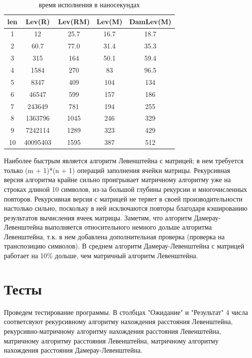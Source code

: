 \documentclass[12pt]{report}
\begin{document}
\begin{table}[H]
	\centering
	\caption{время исполнения в наносекундах}
	\begin{tabular}{|c c c c c|} 
 	\hline
	len & Lev(R) & Lev(RM) & Lev(M) & DamLev(M) \\ [0.5ex] 
 	\hline\hline
  	1 & 12 & 25.7 & 16.7 & 18.7\\
 	\hline
 	2 & 60.7 & 77.0 & 31.4 & 35.3\\
 	\hline
	3 & 315 & 164 & 50.1 & 59.4\\
	\hline
	4 & 1584 & 270 & 83 & 96.5\\
	\hline
	5 & 8347 & 409 & 104 & 134\\
	\hline
	6 & 46547 & 599 & 157 & 186\\
	\hline
	7 & 243649 & 781 & 194 & 255\\
	\hline
	8 & 1363796 & 1045 & 246 & 329\\
	\hline
	9 & 7242114 & 1289 & 323 & 429\\
	\hline
	10 & 40095403 & 1595 & 387 & 512\\
	\hline
	\end{tabular}
\end{table}

\par
Наиболее быстрым является алгоритм Левенштейна с матрицей;
в нем требуется только (m + 1)*(n + 1) операций заполнения ячейки матрицы.
Рекурсивная версия алгоритма крайне сильно проигрывает матричному алгоритму уже на строках длиной 10 символов, из-за большой глубины рекурсии и многочисленных повторов.
Рекурсивная версия с матрицей не теряет в своей производительности настолько сильно, поскольку в ней исключаются повторы благодаря кэшированию результатов вычисления ячеек матрицы. Заметим, что алгоритм Дамерау-Левенштейна выполняется относительного немного дольше алгоритма Левенштейна, т.к. в нем добавлена дополнительная проверка (проверка на транспозицию символов). В среднем алгоритм Дамерау-Левенштейна с матрицей работает на 10\% дольше, чем матричный алгоритм Левенштейна.

\section{Тесты}

\par
Проведем тестирование программы. В столбцах "Ожидание" и "Результат" 4 числа соответсвуют рекурсивному алгоритму нахождения расстояния Левенштейна, рекурсивно-матричному алгоритму нахождения расстояния Левенштейна, матричному алгоритму расстояния Левенштейна, матричному алгоритму нахождения расстояния Дамерау-Левенштейна.
\end{document}
